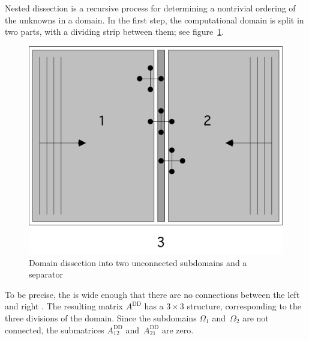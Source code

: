 Nested dissection is a recursive process for determining a nontrivial
ordering of the unknowns in a domain. In the first step, the
computational domain is split in two parts, with a dividing strip
between them; see figure~\ref{fig:domdecomp}.
\begin{figure}[ht]
  \includegraphics[scale=.1]{graphics/domdecomp}
  \caption{Domain dissection into two unconnected subdomains and a separator}
  \label{fig:domdecomp}
\end{figure}
\newcommand\Add{A^{\mathrm{DD}}}
To be precise, the  is wide enough that there are
no connections between the left and right . The resulting
matrix $\Add$ has a $3\times3$ structure, corresponding to the three
divisions of the domain. Since the subdomains $\Omega_1$
and~$\Omega_2$ are not connected, the submatrices $\Add_{12}$
and~$\Add_{21}$ are zero.
